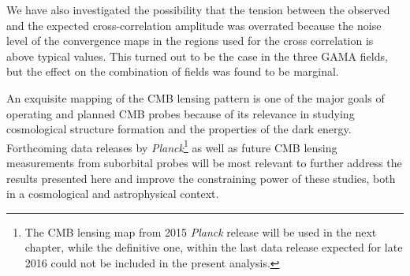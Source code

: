 We have also investigated the possibility that the tension between the observed and the expected cross-correlation amplitude was overrated because the noise level of the convergence maps in the regions used for the cross correlation is above typical values. This turned out to be the case in the three GAMA fields, but the effect on the combination of fields was found to be marginal.

An exquisite mapping of the \gls{CMB} lensing pattern is one of the major goals of operating and planned \gls{CMB} probes because of its relevance in studying cosmological structure formation and the properties of the dark energy. Forthcoming data releases by \textit{Planck}\footnote{The \gls{CMB} lensing map from 2015 \textit{Planck} release will be used in the next chapter, while the definitive one, within the last data release expected for late 2016 could not be included in the present analysis.} as well as future \gls{CMB} lensing measurements from suborbital probes will be most relevant to further address the results presented here and improve the constraining power of these studies, both in a cosmological and astrophysical context.

